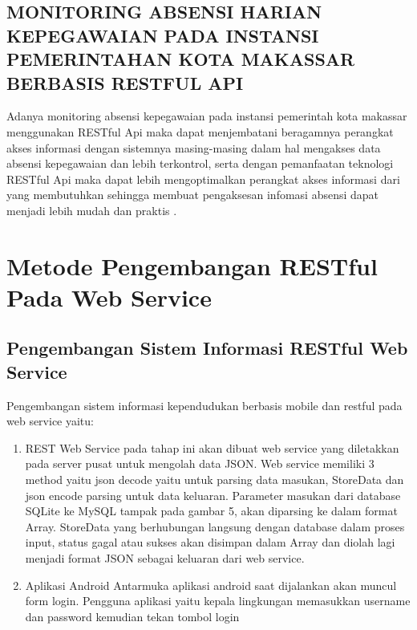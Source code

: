 \subsection{MONITORING ABSENSI HARIAN KEPEGAWAIAN PADA INSTANSI PEMERINTAHAN KOTA MAKASSAR BERBASIS RESTFUL API}
Adanya monitoring absensi kepegawaian pada instansi pemerintah kota makassar menggunakan RESTful Api maka dapat menjembatani beragamnya perangkat akses informasi dengan sistemnya masing-masing dalam hal mengakses data absensi kepegawaian dan lebih terkontrol, serta dengan pemanfaatan teknologi RESTful Api maka dapat lebih mengoptimalkan perangkat akses informasi dari yang membutuhkan sehingga membuat pengaksesan infomasi absensi dapat menjadi lebih mudah dan praktis \cite{sy2017monitoring}.

\section{Metode Pengembangan RESTful Pada Web Service}
\subsection{Pengembangan Sistem Informasi RESTful Web Service}
Pengembangan sistem informasi kependudukan berbasis mobile dan restful pada web service yaitu\cite{kurniawati2016pengembangan}:
\begin{enumerate}
\item REST Web Service pada tahap ini akan dibuat web service yang diletakkan pada server pusat untuk mengolah data JSON. Web service memiliki 3 method yaitu json decode yaitu untuk parsing data masukan, StoreData dan json encode parsing untuk data keluaran. Parameter masukan dari database SQLite ke MySQL tampak pada gambar 5, akan diparsing ke dalam format Array. StoreData yang berhubungan langsung dengan database dalam proses input, status gagal atau sukses akan disimpan dalam Array dan diolah lagi menjadi format JSON sebagai keluaran dari web service.
\item Aplikasi Android Antarmuka aplikasi android saat dijalankan akan muncul form login. Pengguna aplikasi yaitu kepala lingkungan memasukkan username dan password kemudian tekan tombol login
\end{enumerate}

